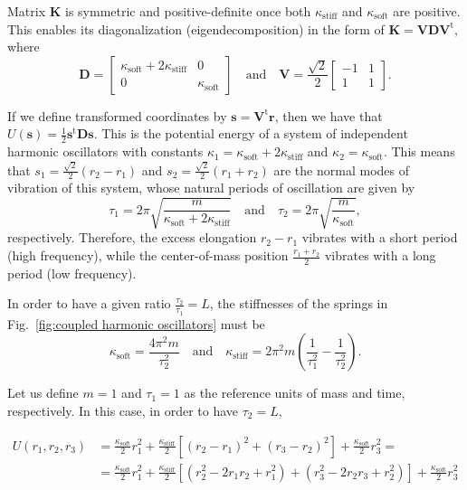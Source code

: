 \documentclass[
aip,
jcp,
reprint,
]{revtex4-1}
\newcommand{\mt}[1]{\boldsymbol{\mathbf{#1}}}          %
\newcommand{\vt}[1]{\boldsymbol{\mathbf{#1}}}          %
\newcommand{\tr}[1]{#1^\text{t}}                       %
\begin{document}
Matrix $\mt K$ is symmetric and positive-definite once both $\kappa_\mathrm{stiff}$ and $\kappa_\mathrm{soft}$ are positive.
This enables its diagonalization (eigendecomposition) in the form of ${\mt K} = {\vt V} {\mt D} \tr{\mt V}$, where
\begin{equation*}
{\mt D} = 
\begin{bmatrix}
\kappa_\mathrm{soft} + 2\kappa_\mathrm{stiff} & 0 \\
0 & \kappa_\mathrm{soft}
\end{bmatrix}
\quad \mathrm{and} \quad
{\mt V} = \frac{\sqrt{2}}{2}
\begin{bmatrix}
-1 & 1 \\
1 & 1
\end{bmatrix}.
\end{equation*}

If we define transformed coordinates by $\vt s = \tr{\mt V}{\vt r}$, then we have that $U(\vt s) = \frac{1}{2} \tr{\vt s} \mt D \vt s$.
This is the potential energy of a system of independent harmonic oscillators with constants $\kappa_1 = \kappa_\mathrm{soft} + 2\kappa_\mathrm{stiff}$ and $\kappa_2 = \kappa_\mathrm{soft}$.
This means that $s_1 = \frac{\sqrt{2}}{2} (r_2 - r_1)$ and $s_2 = \frac{\sqrt{2}}{2} (r_1 + r_2)$ are the normal modes of vibration of this system, whose natural periods of oscillation are given by
\begin{equation}
\tau_1 = 2\pi\sqrt{\frac{m}{\kappa_\mathrm{soft} + 2\kappa_\mathrm{stiff}}}
\quad \mathrm{and} \quad
\tau_2 = 2\pi\sqrt{\frac{m}{\kappa_\mathrm{soft}}},
\end{equation}
respectively. Therefore, the excess elongation $r_2 - r_1$ vibrates with a short period (high frequency), while the center-of-mass position $\frac{r_1 + r_2}{2}$ vibrates with a long period (low frequency).

In order to have a given ratio $\frac{\tau_2}{\tau_1} = L$, the stiffnesses of the springs in Fig.~\ref{fig:coupled harmonic oscillators} must be
\begin{equation*}
\kappa_\mathrm{soft} = 	\frac{4\pi^2 m}{\tau_2^2}
\quad \mathrm{and} \quad
\kappa_\mathrm{stiff} = 2\pi^2 m \left(\frac{1}{\tau_1^2} - \frac{1}{\tau_2^2}\right).
\end{equation*}


Let us define $m = 1$ and $\tau_1 = 1$ as the reference units of mass and time, respectively.
In this case, in order to have $\tau_2 = L$, 


\begin{align*}
U(r_1, r_2, r_3) &= \frac{\kappa_\mathrm{soft}}{2} r_1^2 + \frac{\kappa_\mathrm{stiff}}{2} [(r_2 - r_1)^2 + (r_3 - r_2)^2] + \frac{\kappa_\mathrm{soft}}{2} r_3^2 = \\
&= \frac{\kappa_\mathrm{soft}}{2} r_1^2 + \frac{\kappa_\mathrm{stiff}}{2} [(r_2^2 - 2 r_1 r_2 + r_1^2) + (r_3^2 - 2r_2 r_3 + r_2^2)] + \frac{\kappa_\mathrm{soft}}{2} r_3^2
\end{align*}
\end{document}
